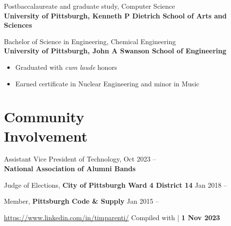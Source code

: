 \documentclass[11pt]{article}
\newcommand{\lmr}{\fontfamily{lmr}\selectfont} %
\newcommand{\textdb}[1]{\fontseries{db}\selectfont#1\normalfont}
\newcommand{\present}{\phantom{Xxx 20XX}}
\begin{document}
\textdb{
Postbaccalaureate and graduate study, Computer Science
	\\
}
\textbf{University of Pittsburgh, Kenneth P Dietrich School of Arts and Sciences}

\textdb{
Bachelor of Science in Engineering, Chemical Engineering
	\\
}
\textbf{University of Pittsburgh, John A Swanson School of Engineering}
\begin{itemize}
	\item Graduated with \emph{cum laude} honors
	\item Earned certificate in Nuclear Engineering and minor in Music
\end{itemize}



\section{Community\\ Involvement}

\textdb{
Assistant Vice President of Technology,
	\hfill Oct 2023 -- \present \\
}
\textbf{National Association of Alumni Bands}

\textdb{
Judge of Elections,
\textbf{City of Pittsburgh Ward 4 District 14}
	\hfill Jan 2018 -- \present
}

\textdb{
Member,
\textbf{Pittsburgh Code \& Supply}
	\hfill Jan 2015 -- \present
}



\begin{adjustwidth}{-1in}{0pt}
	\hrulefill \par
	\hypersetup{linkcolor=gray}
	\small
	\url{https://www.linkedin.com/in/timparenti/} \hfill {\lmr Compiled with \XeLaTeX} | \textbf{1 Nov 2023}
\end{adjustwidth}
\end{document}
